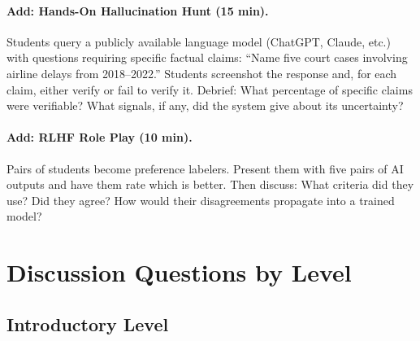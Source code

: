 \paragraph{Add: Hands-On Hallucination Hunt (15 min).}
Students query a publicly available language model (ChatGPT, Claude, etc.) with questions requiring specific factual claims: ``Name five court cases involving airline delays from 2018--2022.'' Students screenshot the response and, for each claim, either verify or fail to verify it. Debrief: What percentage of specific claims were verifiable? What signals, if any, did the system give about its uncertainty?

\paragraph{Add: RLHF Role Play (10 min).}
Pairs of students become preference labelers. Present them with five pairs of AI outputs and have them rate which is better. Then discuss: What criteria did they use? Did they agree? How would their disagreements propagate into a trained model?

\section{Discussion Questions by Level}

\subsection{Introductory Level}

